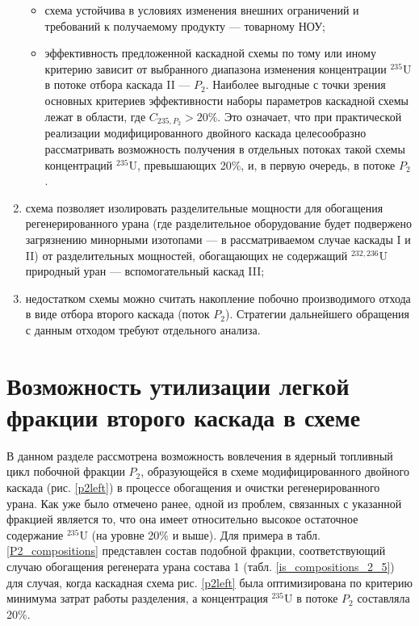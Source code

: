 \begin{enumerate}
\begin{itemize}
        \item схема устойчива в условиях изменения внешних ограничений и требований к получаемому продукту --- товарному НОУ;
        \item эффективность предложенной каскадной схемы по тому или иному критерию зависит от выбранного диапазона изменения концентрации $^{235}$U в потоке отбора каскада II --- $P_2$. Наиболее выгодные с точки зрения основных критериев эффективности наборы параметров каскадной схемы лежат в области, где $C_{235,{P_2}} > 20\%$. Это означает, что при практической реализации модифицированного двойного каскада целесообразно рассматривать возможность получения в отдельных потоках такой схемы концентраций $^{235}$U, превышающих 20\%, и, в первую очередь, в потоке $P_2$.
    \end{itemize}       
    \item схема позволяет изолировать разделительные мощности для обогащения регенерированного урана (где разделительное оборудование будет подвержено загрязнению минорными изотопами --- в рассматриваемом случае каскады I и II) от разделительных мощностей, обогащающих не содержащий $^{232,236}$U природный уран --- вспомогательный каскад III;
    \item недостатком схемы можно считать накопление побочно производимого отхода в виде отбора второго каскада (поток $P_2$). Стратегии дальнейшего обращения с данным отходом требуют отдельного анализа.
\end{enumerate}


\section{Возможность утилизации легкой фракции второго каскада в схеме}

В данном разделе рассмотрена возможность вовлечения в ядерный топливный цикл побочной фракции $P_2$, образующейся в схеме модифицированного двойного каскада (рис. \ref{p2left}) в процессе обогащения и очистки регенерированного урана. Как уже было отмечено ранее, одной из проблем, связанных с указанной фракцией является то, что она имеет относительно высокое остаточное содержание $^{235}$U (на уровне 20\% и выше). Для примера в табл. \ref{P2_compositions} представлен состав подобной фракции, соответствующий случаю обогащения регенерата урана состава 1 (табл. \ref{is_compositions_2_5}) для случая, когда каскадная схема рис. \ref{p2left} была оптимизирована по критерию минимума затрат работы разделения, а концентрация $^{235}$U в потоке $P_2$ составляла 20\%. 

